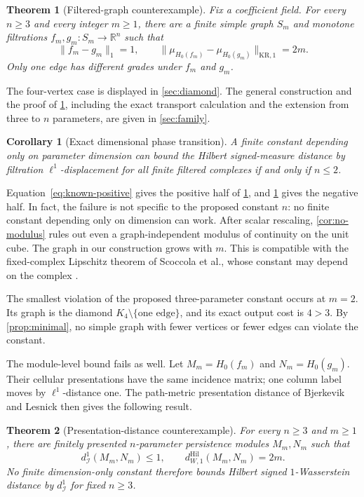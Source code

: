 \documentclass[11pt]{article}
\newtheorem{theorem}{Theorem}[section]
\newtheorem{corollary}[corollary]{Corollary}
\theoremstyle{definition}
\newcommand{\R}{\mathbb{R}}
\newcommand{\1}{\mathbf{1}}
\newcommand{\KR}{\mathrm{KR}}
\newcommand{\Hil}{\mathrm{Hil}}
\newcommand{\dI}{d_{\mathcal I}^{1}}
\newcommand{\fm}{f_m}
\newcommand{\gm}{g_m}
\newcommand{\Sm}{S_m}
\begin{document}
\begin{theorem}[Filtered-graph counterexample]\label{thm:main}
Fix a coefficient field.  For every $n\geq3$ and every integer $m\geq1$,
there are a finite simple graph $\Sm$ and monotone filtrations
$\fm,\gm:\Sm\to\R^n$ such that
\[
  \lVert\fm-\gm\rVert_1=1,\qquad
  \bigl\lVert\mu_{H_0(\fm)}-\mu_{H_0(\gm)}\bigr\rVert_{\KR,1}=2m.
\]
Only one edge has different grades under $\fm$ and $\gm$.
\end{theorem}

The four-vertex case is displayed in \cref{sec:diamond}.  The general
construction and the proof of \cref{thm:main}, including the exact transport
calculation and the extension from three to $n$ parameters, are given in
\cref{sec:family}.

\begin{corollary}[Exact dimensional phase transition]\label{cor:phase}
A finite constant depending only on parameter dimension can bound the
Hilbert signed-measure distance by filtration $\ell^1$-displacement for all
finite filtered complexes if and only if $n\leq2$.
\end{corollary}

Equation~\eqref{eq:known-positive} gives the positive half of
\cref{cor:phase}, and \cref{thm:main} gives the negative half.  In fact, the
failure is not specific to the proposed constant $n$: no finite constant
depending only on dimension can work.  After scalar rescaling,
\cref{cor:no-modulus} rules out even a graph-independent modulus of
continuity on the unit cube.  The graph in our construction grows with $m$.
This is compatible with the fixed-complex Lipschitz theorem of Scoccola et
al., whose constant may depend on the complex
\cite[Proposition~E.3]{ScoccolaEtAl2024}.

The smallest violation of the proposed three-parameter constant occurs at
$m=2$.  Its graph is the diamond $K_4\setminus\{\text{one edge}\}$, and its
exact output cost is $4>3$.  By \cref{prop:minimal}, no simple graph with
fewer vertices or fewer edges can violate the constant.

The module-level bound fails as well.  Let $M_m=H_0(f_m)$ and
$N_m=H_0(g_m)$.  Their cellular presentations have the same incidence
matrix; one column label moves by $\ell^1$-distance one.  The path-metric
presentation distance of Bjerkevik and Lesnick
\cite{BjerkevikLesnick2021} then gives the following result.

\begin{theorem}[Presentation-distance counterexample]\label{thm:p3}
For every $n\geq3$ and $m\geq1$, there are finitely presented
$n$-parameter persistence modules $M_m,N_m$ such that
\[
  \dI(M_m,N_m)\leq1,\qquad
  d^{\Hil}_{W,1}(M_m,N_m)=2m.
\]
No finite dimension-only constant therefore bounds Hilbert signed
$1$-Wasserstein distance by $\dI$ for fixed $n\geq3$.
\end{theorem}
\end{document}
